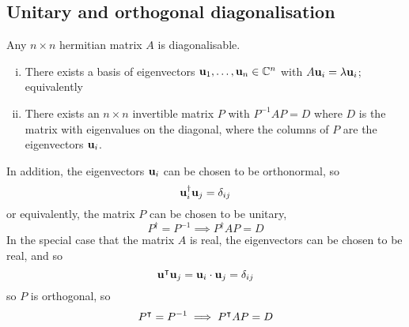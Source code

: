 \subsection{Unitary and orthogonal diagonalisation}
\begin{theorem}
	Any \(n\times n\) hermitian matrix \(A\) is diagonalisable.
	\begin{enumerate}[(i)]
		\item There exists a basis of eigenvectors \(\vb u_1, \dots, \vb u_n \in \mathbb C^n\) with \(A\vb u_i = \lambda \vb u_i\); equivalently
		\item There exists an \(n \times n\) invertible matrix \(P\) with \(P^{-1}AP = D\) where \(D\) is the matrix with eigenvalues on the diagonal, where the columns of \(P\) are the eigenvectors \(\vb u_i\).
	\end{enumerate}
	In addition, the eigenvectors \(\vb u_i\) can be chosen to be orthonormal, so
	\[
		\vb u^\dagger_i \vb u_j = \delta_{ij}
	\]
	or equivalently, the matrix \(P\) can be chosen to be unitary,
	\[
		P^\dagger = P^{-1} \implies P^\dagger AP = D
	\]
	In the special case that the matrix \(A\) is real, the eigenvectors can be chosen to be real, and so
	\[
		\vb u^\intercal \vb u_j = \vb u_i \cdot \vb u_j = \delta_{ij}
	\]
	so \(P\) is orthogonal, so
	\[
		P^\intercal = P^{-1} \implies P^\intercal AP = D
	\]
\end{theorem}
